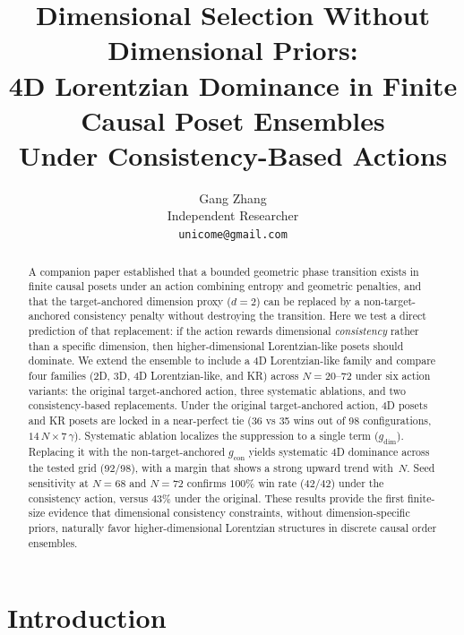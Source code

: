 \documentclass[11pt,a4paper]{article}
\title{Dimensional Selection Without Dimensional Priors:\\
4D Lorentzian Dominance in Finite Causal Poset Ensembles\\
Under Consistency-Based Actions}
\author{Gang Zhang\\
\small Independent Researcher\\
\small \texttt{unicome@gmail.com}}
\date{}
\begin{document}
\maketitle

\begin{abstract}
A companion paper established that a bounded geometric phase transition exists in finite causal posets under an action combining entropy and geometric penalties, and that the target-anchored dimension proxy ($d = 2$) can be replaced by a non-target-anchored consistency penalty without destroying the transition. Here we test a direct prediction of that replacement: if the action rewards dimensional \emph{consistency} rather than a specific dimension, then higher-dimensional Lorentzian-like posets should dominate. We extend the ensemble to include a 4D Lorentzian-like family and compare four families (2D, 3D, 4D Lorentzian-like, and KR) across $N = 20$--$72$ under six action variants: the original target-anchored action, three systematic ablations, and two consistency-based replacements. Under the original target-anchored action, 4D posets and KR posets are locked in a near-perfect tie (36 vs 35 wins out of 98 configurations, $14\,N \times 7\,\gamma$). Systematic ablation localizes the suppression to a single term ($g_{\text{dim}}$). Replacing it with the non-target-anchored $g_{\text{con}}$ yields systematic 4D dominance across the tested grid (92/98), with a margin that shows a strong upward trend with~$N$. Seed sensitivity at $N = 68$ and $N = 72$ confirms $100\%$ win rate (42/42) under the consistency action, versus $43\%$ under the original. These results provide the first finite-size evidence that dimensional consistency constraints, without dimension-specific priors, naturally favor higher-dimensional Lorentzian structures in discrete causal order ensembles.
\end{abstract}

\section{Introduction}
\end{document}

